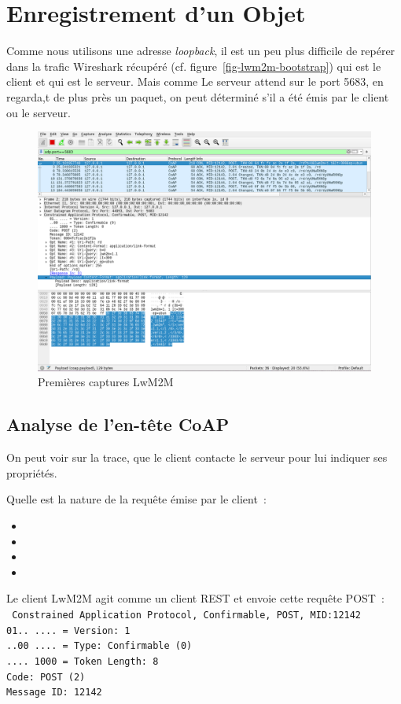 \section{Enregistrement d'un Objet}

Comme nous utilisons une adresse \textit{loopback}, il est un peu plus difficile de repérer dans la trafic Wireshark récupéré (cf. figure~\vref{fig-lwm2m-bootstrap}) qui est le client et qui est le serveur. Mais comme Le serveur attend sur le port 5683, en regarda,t de plus près un paquet, on peut déterminé s'il a été émis par le client ou le serveur.

\begin{figure}[tbp]
\centerline{\includegraphics[width=.9\columnwidth]{Pictures/lwm2m-bootstrap.png}}
\caption{Premières captures LwM2M}
\label{fig-lwm2m-bootstrap}
\end{figure}

\subsection{Analyse de l'en-tête CoAP}
On peut voir sur la trace, que le client contacte le serveur pour lui indiquer ses propriétés.

{Quelle est la nature de la requête émise par le client~:
\begin{itemize}[label=$\circ$]
   \item {}
   \item {}
   \item {}
   \item {}
\end{itemize}}
{
Le client LwM2M agit comme un client REST et envoie cette requête POST~:\\
\noindent\texttt{
Constrained Application Protocol, Confirmable, POST, MID:12142\\
    01.. .... = Version: 1\\
    ..00 .... = Type: Confirmable (0)\\
    .... 1000 = Token Length: 8\\
    Code: POST (2)\\
    Message ID: 12142\\
}
}

